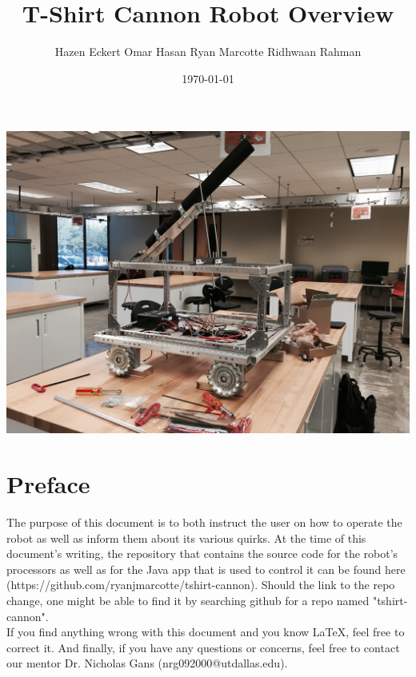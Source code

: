 \documentclass[letterpaper,12pt]{article}
\begin{document}
\title{\textbf{T-Shirt Cannon Robot Overview}}
\author{Hazen Eckert \hspace{3mm} Omar Hasan \hspace{3mm} Ryan Marcotte \hspace{3mm} Ridhwaan Rahman}
\date{\today}
\maketitle

\begin{center}
    \includegraphics[width=15cm]{./pics/chassis/robot.jpg}
\end{center}

\pagebreak

\section*{Preface}
The purpose of this document is to both instruct the user on how to operate the
robot as well as inform them about its various quirks. At the time of this
document's writing, the repository that contains the source code for the
robot's processors as well as for the Java app that is used to control it
can be found here (https://github.com/ryanjmarcotte/tshirt-cannon). Should
the link to the repo change, one might be able to find it by searching github
for a repo named "tshirt-cannon".\\

If you find anything wrong with this document and you know LaTeX, feel free to
correct it. And finally, if you have any questions or concerns, feel free to
contact our mentor Dr. Nicholas Gans (nrg092000@utdallas.edu).\\
\end{document}

